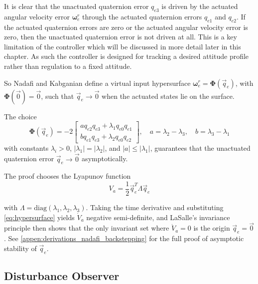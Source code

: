It is clear that the unactuated quaternion error $q_{e3}$ is driven by the actuated angular velocity error $\boldsymbol{\omega}^r_e$ through the actuated quaternion errors $q_{e1}$ and $q_{e2}$. If the actuated quaternion errors are zero or the actuated angular velocity error is zero, then the unactuated quaternion error is not driven at all. This is a key limitation of the controller which will be discussed in more detail later in this chapter. As such the controller is designed for tracking a desired attitude profile rather than regulation to a fixed attitude. 

 So Nadafi and Kabganian define a virtual input hypersurface $\boldsymbol{\omega}^r_e = \boldsymbol{\Phi}(\vec{q}_e)$, with $\boldsymbol{\Phi}(\vec{0}) = \vec{0}$, such that $\vec{q}_e \to \vec{0}$ when the actuated states lie on the surface.

The choice
\begin{equation}
    \boldsymbol{\Phi}(\vec{q}_e) = -2\begin{bmatrix}
        a q_{e2} q_{e3} + \lambda_1 q_{e0} q_{e1} \\
        b q_{e1} q_{e3} + \lambda_2 q_{e0} q_{e2}
    \end{bmatrix}, \quad a = \lambda_2 - \lambda_3,\quad b = \lambda_3 - \lambda_1
    \label{eq:hypersurface}
\end{equation}
with constants $\lambda_i > 0$, $|\lambda_1| = |\lambda_2|$, and $|a| \leq |\lambda_1|$, guarantees that the unactuated quaternion error $\vec{q}_e \to \vec{0}$ asymptotically.

The proof chooses the Lyapunov function 
\begin{equation}
    V_a = \frac{1}{2}\vec{q}_e^T \Lambda \vec{q}_e
\end{equation}

with $\Lambda = \mathrm{diag}(\lambda_1, \lambda_2, \lambda_3)$. Taking the time derivative and substituting \autoref{eq:hypersurface} yields $\dot{V}_a$ negative semi-definite, and LaSalle's invariance principle then shows that the only invariant set where $\dot{V}_a = 0$ is the origin $\vec{q}_e = \vec{0}$. See \autoref{appen:derivations_nadafi_backstepping} for the full proof of asymptotic stability of $\vec{q}_e$.

\subsection{Disturbance Observer}

